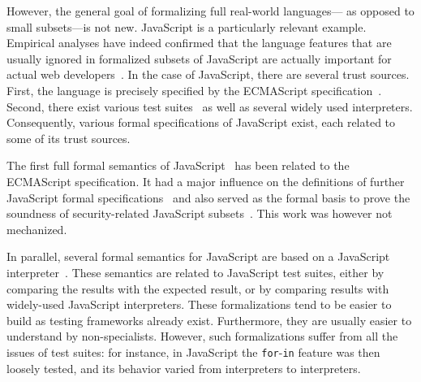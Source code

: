 \documentclass[
    sigplan,
    10pt,
    review, %
    natbib=false %
 ]{acmart}
\begin{document}

However, the general goal of formalizing full real-world languages---%
as opposed to small subsets---is not new.
%
JavaScript is a particularly relevant example.
Empirical analyses
have indeed confirmed that the language features
that are usually ignored in formalized subsets of JavaScript
are actually important for actual web developers~\parencite{RichardsHBV11}.
%
In the case of JavaScript, there are several trust sources.
First, the language is precisely specified by the ECMAScript specification~\parencite{es2019}.
Second, there exist various test suites~\parencite{test262, mozillatests}
as well as several widely used interpreters.
Consequently, various formal specifications of JavaScript exist,
each related to some of its trust sources.

The first full formal semantics of JavaScript~\parencite{aplas08}
has been related to the ECMAScript specification.
It had a major influence on the definitions of further JavaScript formal
specifications~\parencite{usenix, popl14jscert, popl12-Towards, ses} and also served as the formal basis to prove the soundness of security-related
JavaScript subsets~\parencite{mmt-esorics09, mmt-oakland10}.
This work was however not mechanized.

In parallel, several formal semantics
for JavaScript are based on a JavaScript interpreter~\parencite{Guha2010,  kjs, Politz:S5}.
These semantics are related to JavaScript test suites,
either by comparing the results with the expected result,
or by comparing results with widely-used JavaScript interpreters.
These formalizations tend to be easier to build
as testing frameworks already exist.
Furthermore, they are usually easier to understand by non-specialists.
However, such formalizations suffer from all the issues of test suites:
for instance, in JavaScript the \texttt{for}-\texttt{in} feature was then loosely tested,
and its behavior varied from interpreters to interpreters.
\end{document}
